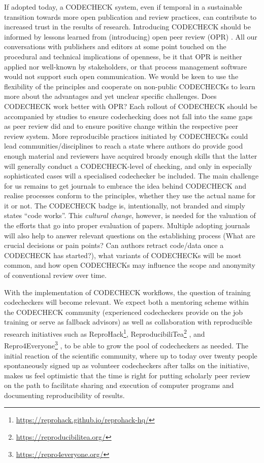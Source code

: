 \documentclass[12pt]{article}
\begin{document}
If adopted today, a CODECHECK system, even if temporal in a sustainable 
transition towards more open publication and review practices, can contribute
to increased trust in the results of research. Introducing CODECHECK
should be informed by lessons learned from (introducing) open peer review
(OPR) \cite{ross-hellauer_guidelines_2019}.
All our conversations with publishers and editors at some point
touched on the procedural and technical implications of openness, be it 
that OPR is neither applied nor well-known by stakeholders, or that process
management software would not support such open communication.
We would be keen to use the flexibility of the principles and cooperate
on non-public CODECHECKs to learn more about the advantages and yet unclear
specific challenges. Does CODECHECK work better with OPR?
Each rollout of CODECHECK should be accompanied by studies to ensure 
codechecking does not fall into the same gaps as peer review did \cite{tennant_limitations_2020}
and to ensure positive change within the respective peer review system.
More reproducible practices initiated by CODECHECKs could lead
communities/disciplines to reach a state where authors do provide good
enough material and reviewers have acquired broady enough skills that
the latter will generally conduct a CODECHECK-level of checking, and
only in especially sophisticated cases will a specialised codechecker
be included.
The main challenge for us remains to get journals to embrace the
idea behind CODECHECK and realise processes conform to the principles,
whether they use the actual name for it or not.
The CODECHECK badge is, intentionally, not branded and simply states
``code works''.
This \emph{cultural change}, however, is needed for the valuation of the
efforts that go into proper evaluation of papers.
Multiple adopting journals will also help to answer relevant questions on
the establishing process (What are crucial decisions or pain points? Can
authors retract code/data once a CODECHECK has started?),
what variants of CODECHECKs will be most common, and how open CODECHECKs
may influence the scope and anonymity of conventional review over time.

With the implementation of CODECHECK workflows, the question of training
codecheckers will become relevant. We expect both a mentoring scheme within
the CODECHECK community (experienced codecheckers provide on the job training
or serve as fallback advisors) as well as collaboration with reproducible
research initiatives such as
ReproHack\footnote{\url{https://reprohack.github.io/reprohack-hq/}},
ReproducibiliTea\footnote{\url{https://reproducibilitea.org/}}
\cite{fitzgibbon_brewing_2020},
and Repro4Everyone\footnote{\url{https://repro4everyone.org/}}
\cite{auer_reproducibility_2020},
to be able to grow the pool of codecheckers as needed.
The initial reaction of the scientific community, where up to today over 
twenty people spontaneously signed up as volunteer codecheckers after talks
on the initiative, makes us feel optimistic that the time is right for 
putting scholarly peer review on the path to facilitate sharing and execution
of computer programs and documenting reproducibility of results.
\end{document}
